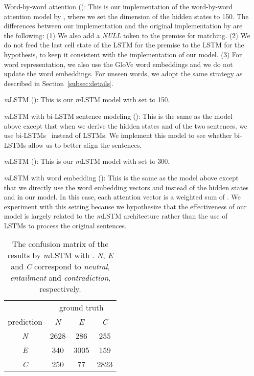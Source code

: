\documentclass[11pt,letterpaper]{article}
\begin{document}
\begin{compactitem}
	\item Word-by-word attention (): This is our implementation of the word-by-word attention model by , where we set the dimension of the hidden states to 150.
	The differences between our implementation and the original implementation by  are the following: 
	(1) We also add a \emph{NULL} token to the premise for matching.
	(2) We do not feed the last cell state of the LSTM for the premise to the LSTM for the hypothesis, to keep it consistent with the implementation of our model.
	(3) For word representation, we also use the GloVe word embeddings and we do not update the word embeddings.
	For unseen words, we adopt the same strategy as described in Section~\ref{subsec:details}.
	
	\item \emph{m}LSTM (): This is our \emph{m}LSTM model with  set to 150. 
	
	\item \emph{m}LSTM with bi-LSTM sentence modeling (): This is the same as the model above except that when we derive the hidden states  and  of the two sentences, we use bi-LSTMs~\cite{graves2012supervised} instead of LSTMs.
	We implement this model to see whether bi-LSTMs allow us to better align the sentences.
	
	\item \emph{m}LSTM (): This is our \emph{m}LSTM model with  set to 300.
	
	\item \emph{m}LSTM with word embedding (): This is the same as the model above except that we directly use the word embedding vectors  and  instead of the hidden states  and  in our model.
	In this case, each attention vector  is a weighted sum of .
	We experiment with this setting because we hypothesize that the effectiveness of our model is largely related to the \emph{m}LSTM architecture rather than the use of LSTMs to process the original sentences.
	
\end{compactitem}

\begin{table}[]
	\centering
	\small
	\begin{tabular}{c|ccc}
		\toprule
		& \multicolumn{3}{c}{ground truth} \\
		prediction &  \emph{N}            & \emph{E}           & \emph{C}           \\ \midrule
		\emph{N}   & 2628    & 286  & 255  \\
		\emph{E}   & 340 & 3005   & 159  \\ 
		\emph{C}   & 250 & 77 & 2823 \\ \bottomrule
	\end{tabular}
	\normalsize
	\caption{The confusion matrix of the results by \emph{m}LSTM with . 
		\emph{N}, \emph{E} and \emph{C} correspond to \emph{neutral}, \emph{entailment} and \emph{contradiction}, respectively.}
	\label{tab:confusion_m}
\end{table}
\end{document}
